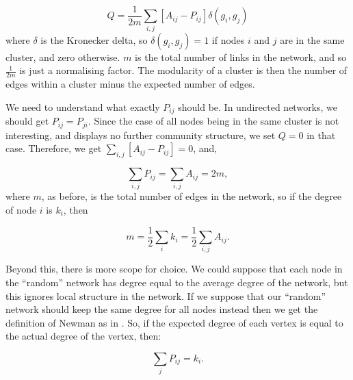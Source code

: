 \begin{equation}
Q = \frac{1}{2m}\sum_{i,j}[A_{ij} - P_{ij}]\delta(g_i,g_j)
\end{equation}
where $\delta$ is the Kronecker delta, so $\delta(g_i,g_j)=1$ if nodes 
$i$ and $j$ are in the same cluster, and zero otherwise. $m$ is the total 
number of links in the network, and so $\frac{1}{2m}$ is just a normalising 
factor.  The modularity of a cluster is then the number of edges within a 
cluster minus the expected number of edges.

We need to understand what exactly $P_{ij}$ should be.  In undirected networks, 
we should get $P_{ij} = P_{ji}$.  Since the case of all nodes being in the same 
cluster is not interesting, and displays no further community structure, we set 
$Q=0$ in that case.  Therefore, we get $\sum_{i,j}[A_{ij} - P_{ij}] = 0$, and,

\begin{equation}
\sum_{i,j}P_{ij} = \sum_{i,j} A_{ij} = 2m,
\end{equation}
where $m$, as before, is the total number of edges in the network, so if the 
degree of node $i$ is $k_i$, then

\begin{equation}
m = \frac{1}{2}\sum_ik_i = \frac{1}{2}\sum_{i,j}A_{ij}.
\end{equation}

Beyond this, there is more scope for choice.  We could suppose that each node 
in the ``random'' network has degree equal to the average degree of the 
network, but this ignores local structure in the network.  If we suppose that 
our ``random'' network should keep the same degree for all nodes instead then 
we get the definition of Newman as in \cite{Newman2006a}.  So, if the expected 
degree of each vertex is equal to the actual degree of the vertex, then:

\begin{equation}
\sum_j P_{ij} = k_i.
\label{probki}
\end{equation}

